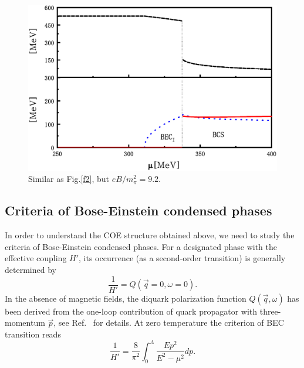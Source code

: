 \documentclass[prd, showpacs,nofootinbib,amsmath,amssymb,12pt]{revtex4}
\begin{document}
\begin{figure}[ht]
	\centering
	\includegraphics[scale=0.3]{92v2.eps}
	\caption{Similar as Fig.\ref{f2}, but $eB/m^2_\pi=9.2$.}
	\label{f3}
\end{figure}

\subsection{Criteria of Bose-Einstein condensed phases}
\label{sec:3b}

In order to understand the COE structure obtained above, we need to study the criteria of Bose-Einstein condensed phases.
For a designated phase with the effective coupling $H'$, its occurrence (as a second-order transition) is generally determined by~\cite{nishida2005bcs}
\begin{equation}
\label{eq:omegasecond}
 \frac{1}{H'}= Q(\vec{q} =0, \omega =0).
\end{equation}
In the absence of magnetic fields, the diquark polarization function $Q(\vec{q},\omega)$ has been derived from the 
one-loop contribution of quark propagator with three-momentum $\vec{p}$, see Ref.~\cite{abuki2010nambu} for details.
At zero temperature the criterion of BEC transition reads
\begin{equation}
\label{eq:criticalfor1}
\frac{1}{H'} = \frac{8}{ \pi^2} \int_0^\Lambda\frac{ E p^2}{E^2 - \mu^2} dp.
\end{equation}
\end{document}
